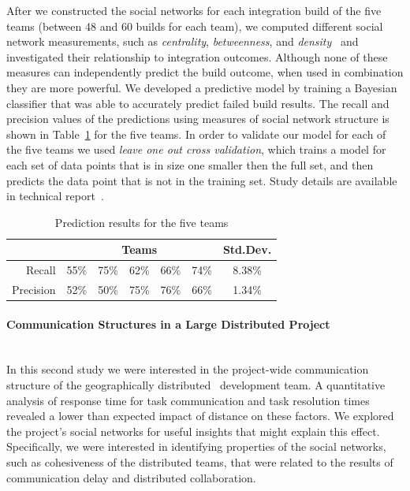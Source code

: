 After we constructed the social networks for each integration build of the five
teams
(between 48 and 60 builds for each team), we computed different social network
measurements, such as \emph{centrality}, \emph{betweenness}, and
\emph{density}~\cite{Wasserman:1994dz} and investigated their relationship to
integration outcomes. Although none of these measures can independently predict
the build outcome, when used in combination they are more powerful. We developed
a predictive model by training a
Bayesian classifier that was able to accurately predict failed build results. The
recall and precision values of the predictions using measures of social network
structure is shown in Table~\ref{tab:predictionResults} for the five teams.
In order to validate our model for each of the five teams we used \emph{leave one
out cross validation}, which trains a model for each set of data points that is
in size one smaller then the full set, and then predicts the data point that is
not in the training set. Study details are available in technical
report~\cite{wolf:tr2008}.


\begin{table}
\small
\begin{tabular}{r|c c c c c|c}
\hline
  & \multicolumn{5}{c|}{Teams} & Std.Dev. \\ \hline
Recall 		& 55\% & 75\% & 62\% & 66\% & 74\% & 8.38\% \\ 
Precision 	& 52\% & 50\% & 75\% & 76\% & 66\% & 1.34\% \\ \hline
\end{tabular}
\caption{Prediction results for the five teams}
\label{tab:predictionResults}
\end{table}





\paragraph{Communication Structures in a Large Distributed Project}
\ \\
In this second study \cite{Nguyen:2008Distance} we were interested in the
project-wide communication structure of the geographically distributed \jazztm\
development team. A quantitative analysis of response time for task
communication and task resolution times revealed a lower than expected impact of distance on these
factors. We explored the project's social networks for useful insights that might
explain this effect. Specifically, we were interested in identifying properties
of the social networks, such as cohesiveness of the distributed teams, that were
related to the results of communication delay and distributed collaboration.

